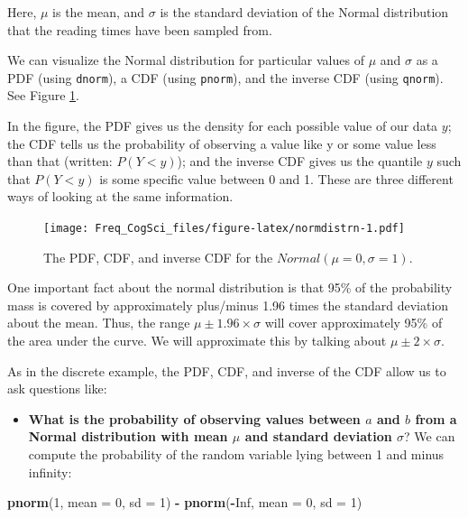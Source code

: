 \documentclass[12pt,]{krantz}
\newenvironment{Shaded}{\begin{snugshade}}{\end{snugshade}}
\newcommand{\DataTypeTok}[1]{\textcolor[rgb]{0.13,0.29,0.53}{#1}}
\newcommand{\DecValTok}[1]{\textcolor[rgb]{0.00,0.00,0.81}{#1}}
\newcommand{\KeywordTok}[1]{\textcolor[rgb]{0.13,0.29,0.53}{\textbf{#1}}}
\newcommand{\NormalTok}[1]{#1}
\newcommand{\OperatorTok}[1]{\textcolor[rgb]{0.81,0.36,0.00}{\textbf{#1}}}
\newcommand{\OtherTok}[1]{\textcolor[rgb]{0.56,0.35,0.01}{#1}}
\newcommand{\StringTok}[1]{\textcolor[rgb]{0.31,0.60,0.02}{#1}}
\providecommand{\tightlist}{%
  \setlength{\itemsep}{0pt}\setlength{\parskip}{0pt}}
\begin{document}
Here, \(\mu\) is the mean, and \(\sigma\) is the standard deviation of the Normal distribution that the reading times have been sampled from.

We can visualize the Normal distribution for particular values of \(\mu\) and \(\sigma\) as a PDF (using \texttt{dnorm}), a CDF (using \texttt{pnorm}), and the inverse CDF (using \texttt{qnorm}). See Figure \ref{fig:normdistrn}.

In the figure, the PDF gives us the density for each possible value of our data \(y\); the CDF tells us the probability of observing a value like y or some value less than that (written: \(P(Y<y)\)); and the inverse CDF gives us the quantile \(y\) such that \(P(Y<y)\) is some specific value between 0 and 1. These are three different ways of looking at the same information.

\begin{figure}
\centering
\texttt{[image: Freq\_CogSci\_files/figure-latex/normdistrn-1.pdf]}
\caption{\label{fig:normdistrn}The PDF, CDF, and inverse CDF for the \(Normal(\mu=0,\sigma=1)\).}
\end{figure}

One important fact about the normal distribution is that 95\% of the probability mass is covered by approximately plus/minus 1.96 times the standard deviation about the mean. Thus, the range \(\mu\pm 1.96\times \sigma\) will cover approximately 95\% of the area under the curve. We will approximate this by talking about \(\mu\pm 2\times \sigma\).

As in the discrete example, the PDF, CDF, and inverse of the CDF allow us to ask questions like:

\begin{itemize}
\tightlist
\item
  \textbf{What is the probability of observing values between \(a\) and \(b\) from a Normal distribution with mean \(\mu\) and standard deviation \(\sigma\)}? We can compute the probability of the random variable lying between 1 and minus infinity:
\end{itemize}

\begin{Shaded}
\begin{Highlighting}[]
\KeywordTok{pnorm}\NormalTok{(}\DecValTok{1}\NormalTok{, }\DataTypeTok{mean =} \DecValTok{0}\NormalTok{, }\DataTypeTok{sd =} \DecValTok{1}\NormalTok{) }\OperatorTok{-}\StringTok{ }\KeywordTok{pnorm}\NormalTok{(}\OperatorTok{-}\OtherTok{Inf}\NormalTok{, }\DataTypeTok{mean =} \DecValTok{0}\NormalTok{, }
  \DataTypeTok{sd =} \DecValTok{1}\NormalTok{)}
\end{Highlighting}
\end{Shaded}
\end{document}
